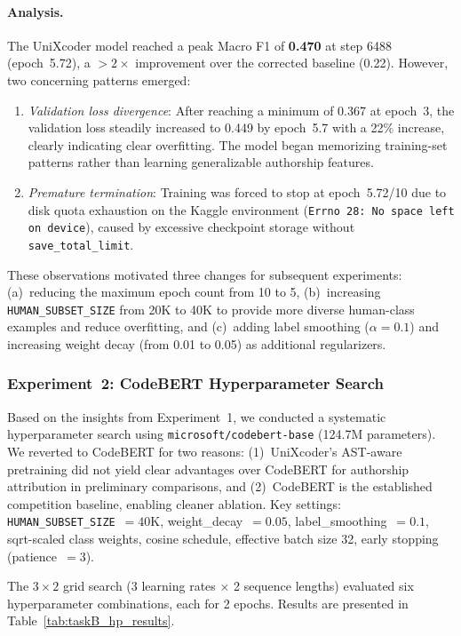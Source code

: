 \documentclass[11pt]{article}
\begin{document}
\paragraph{Analysis.} The UniXcoder model reached a peak Macro F1 of \textbf{0.470} at step 6488 (epoch~5.72), a ${>}2\times$ improvement over the corrected baseline (0.22). However, two concerning patterns emerged:

\begin{enumerate}
    \item \textit{Validation loss divergence}: After reaching a minimum of 0.367 at epoch~3, the validation loss steadily increased to 0.449 by epoch~5.7 with a 22\% increase, clearly indicating clear overfitting. The model began memorizing training-set patterns rather than learning generalizable authorship features.
    \item \textit{Premature termination}: Training was forced to stop at epoch~5.72/10 due to disk quota exhaustion on the Kaggle environment (\texttt{Errno~28: No space left on device}), caused by excessive checkpoint storage without \texttt{save\_total\_limit}.
\end{enumerate}

These observations motivated three changes for subsequent experiments: (a)~reducing the maximum epoch count from 10 to 5, (b)~increasing \texttt{HUMAN\_SUBSET\_SIZE} from 20K to 40K to provide more diverse human-class examples and reduce overfitting, and (c)~adding label smoothing ($\alpha = 0.1$) and increasing weight decay (from 0.01 to 0.05) as additional regularizers.

\subsubsection{Experiment~2: CodeBERT Hyperparameter Search}

Based on the insights from Experiment~1, we conducted a systematic hyperparameter search using \texttt{microsoft/codebert-base} (124.7M parameters). We reverted to CodeBERT for two reasons: (1)~UniXcoder's AST-aware pretraining did not yield clear advantages over CodeBERT for authorship attribution in preliminary comparisons, and (2)~CodeBERT is the established competition baseline, enabling cleaner ablation.
Key settings: \texttt{HUMAN\_SUBSET\_SIZE}~$= 40\text{K}$, weight\_decay~$= 0.05$, label\_smoothing~$= 0.1$, sqrt-scaled class weights, cosine schedule, effective batch size 32, early stopping (patience~$= 3$).

The $3 \times 2$ grid search (3 learning rates $\times$ 2 sequence lengths) evaluated six hyperparameter combinations, each for 2 epochs. Results are presented in Table~\ref{tab:taskB_hp_results}.
\end{document}
